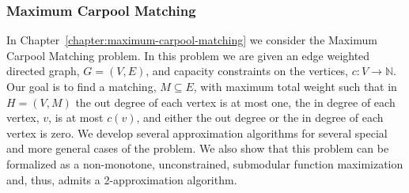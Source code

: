 \subsubsection*{Maximum Carpool Matching}
In Chapter~\ref{chapter:maximum-carpool-matching} we consider the Maximum Carpool Matching problem.
In this problem we are given an edge weighted directed graph, $G=(V, E)$, and capacity constraints on the vertices, $c:V \to \mathbb{N}$.
Our goal is to find a matching, $M \subseteq E$, with maximum total weight such that in $H = (V, M)$ the out degree of each vertex is at most one, the in degree of each vertex, $v$, is at most $c(v)$, and either the out degree or the in degree of each vertex is zero.
We develop several approximation algorithms for several special and more general cases of the problem.
We also show that this problem can be formalized as a non-monotone, unconstrained, submodular function maximization and, thus, admits a 2-approximation algorithm.